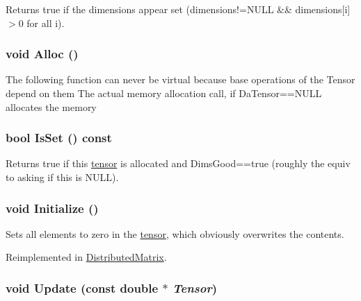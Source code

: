 Returns true if the dimensions appear set (dimensions!=NULL \&\& dimensions\mbox{[}i\mbox{]}$>$0 for all i). \hypertarget{classJKBuilder_1_1tensor_a0ca5cbe96d2a61f06ae4b543ef84f166}{
\subsubsection[{Alloc}]{\setlength{\rightskip}{0pt plus 5cm}void Alloc ()}}
\label{classJKBuilder_1_1tensor_a0ca5cbe96d2a61f06ae4b543ef84f166}
The following function can never be virtual because base operations of the Tensor depend on them The actual memory allocation call, if DaTensor==NULL allocates the memory \hypertarget{classJKBuilder_1_1tensor_a79c9a36acc5dbeab94033ca97971dc09}{
\subsubsection[{IsSet}]{\setlength{\rightskip}{0pt plus 5cm}bool IsSet () const}}
\label{classJKBuilder_1_1tensor_a79c9a36acc5dbeab94033ca97971dc09}


Returns true if this \hyperlink{classJKBuilder_1_1tensor}{tensor} is allocated and DimsGood==true (roughly the equiv to asking if this is NULL). \hypertarget{classJKBuilder_1_1tensor_a98b1050f09da390896f964fb7a892391}{
\subsubsection[{Initialize}]{\setlength{\rightskip}{0pt plus 5cm}void Initialize ()}}
\label{classJKBuilder_1_1tensor_a98b1050f09da390896f964fb7a892391}


Sets all elements to zero in the \hyperlink{classJKBuilder_1_1tensor}{tensor}, which obviously overwrites the contents. 

Reimplemented in \hyperlink{classJKBuilder_1_1DistributedMatrix_a98b1050f09da390896f964fb7a892391}{DistributedMatrix}.\hypertarget{classJKBuilder_1_1tensor_a10ffea2bf428adfa3e8319646c44a3c6}{
\subsubsection[{Update}]{\setlength{\rightskip}{0pt plus 5cm}void Update (const double $\ast$ {\em Tensor})}}
\label{classJKBuilder_1_1tensor_a10ffea2bf428adfa3e8319646c44a3c6}


